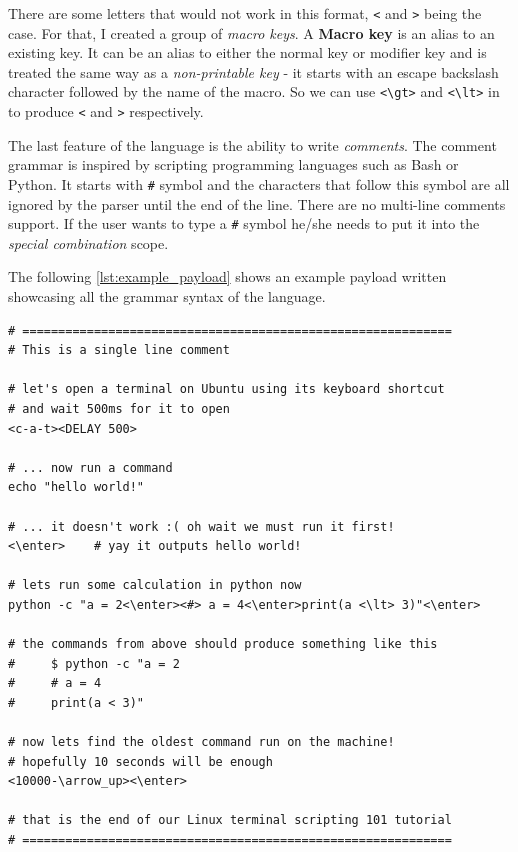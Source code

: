 There are some letters that would not work in this format, \verb|<| and \verb|>| being the case. For that, I created a group of \emph{macro keys}. A \textbf{Macro key} is an alias to an existing key. It can be an alias to either the normal key or modifier key and is treated the same way as a \emph{non-printable key} \-- it starts with an escape backslash character followed by the name of the macro. So we can use \verb|<\gt>| and \verb|<\lt>| in to produce \verb|<| and \verb|>| respectively.

The last feature of the language is the ability to write \emph{comments}. The comment grammar is inspired by scripting programming languages such as Bash or Python. It starts with \verb|#| symbol and the characters that follow this symbol are all ignored by the parser until the end of the line. There are no multi-line comments support. If the user wants to type a \verb|#| symbol he/she needs to put it into the \emph{special combination} scope.

The following \autoref{lst:example_payload} shows an example payload written showcasing all the grammar syntax of the language.
\begin{lstlisting}[caption={Example payload in custom language.},
                   label={lst:example_payload}]
# ============================================================
# This is a single line comment

# let's open a terminal on Ubuntu using its keyboard shortcut
# and wait 500ms for it to open
<c-a-t><DELAY 500>

# ... now run a command
echo "hello world!"

# ... it doesn't work :( oh wait we must run it first!
<\enter>    # yay it outputs hello world!

# lets run some calculation in python now
python -c "a = 2<\enter><#> a = 4<\enter>print(a <\lt> 3)"<\enter>

# the commands from above should produce something like this
#     $ python -c "a = 2
#     # a = 4
#     print(a < 3)"

# now lets find the oldest command run on the machine!
# hopefully 10 seconds will be enough
<10000-\arrow_up><\enter>

# that is the end of our Linux terminal scripting 101 tutorial
# ============================================================
\end{lstlisting}

